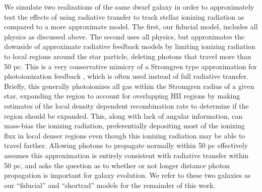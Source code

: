 \documentclass[twocolumn]{aastex61}
\begin{document}
We simulate two realizations of the same dwarf galaxy in order to approximately test the effects of using radiative transfer to track stellar ionizing radiation as compared to a more approximate model. The first, our fiducial model, includes all physics as discussed above. The second uses all physics, but approximates the downside of approximate radiative feedback models by limiting ionizing radiation to local regions around the star particle, deleting photons that travel more than 50 pc. This is a very conservative mimicry of a Stromgren type approximation for photoionization feedback \citep[e.g.][]{Hopkins2012,Hu2017}, which is often used instead of full radiative transfer. Briefly, this generally photoionizes all gas within the Stromgren radius of a given star, expanding the region to account for overlapping HII regions by making estimates of the local density dependent recombination rate to determine if the region should be expanded. This, along with lack of angular information, can mass-bias the ionizing radiation, preferentially depositing most of the ionizing flux in local denser regions even though this ionizing radiation may be able to travel farther. Allowing photons to propagate normally within 50 pc effectively assumes this approximation is entirely consistent with radiative transfer within 50 pc, and asks the question as to whether or not longer distance photon propagation is important for galaxy evolution. We refer to these two galaxies as our ``fiducial'' and ``shortrad'' models for the remainder of this work.

\end{document}
